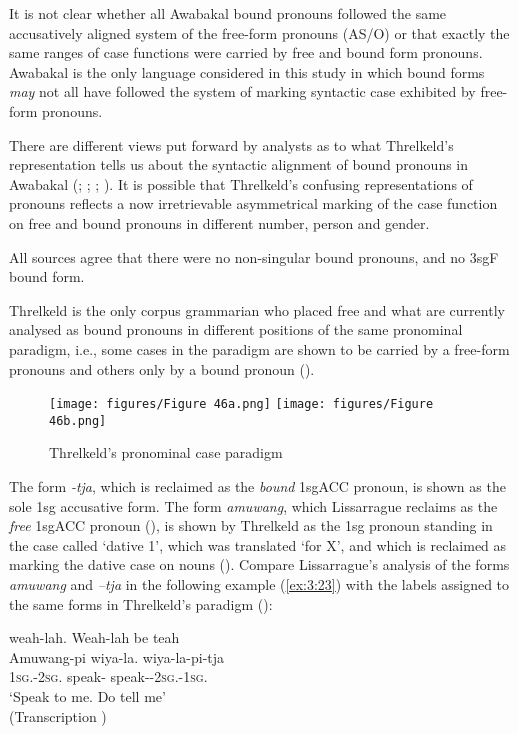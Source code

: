 It is not clear whether all Awabakal bound pronouns followed the same accusatively aligned system of the free-form pronouns (AS/O) or that exactly the same ranges of case functions were carried by free and bound form pronouns. Awabakal is the only language considered in this study in which bound forms \textit{may} not all have followed the system of marking syntactic case exhibited by free-form pronouns.

There are different views put forward by analysts as to what Threlkeld’s representation tells us about the syntactic alignment of bound pronouns in Awabakal (\citealt{capell_structure_1937}; \citealt{oppliger_phonology_1984}; \citealt{lissarrague_salvage_2006}; \citealt{dixon_australian_2002}). It is possible that Threlkeld’s confusing representations of pronouns reflects a now irretrievable asymmetrical marking of the case function on free and bound pronouns in different number, person and gender.

All sources agree that there were no non-singular bound pronouns, and no 3sgF bound form.

Threlkeld is the only corpus grammarian who placed free and what are currently analysed as bound pronouns in different positions of the same pronominal paradigm, i.e., some cases in the paradigm are shown to be carried by a free-form pronouns and others only by a bound pronoun ().
 
\begin{figure}
\texttt{[image: figures/Figure 46a.png]}
\texttt{[image: figures/Figure 46b.png]}
\caption{\label{fig:3:46} Threlkeld’s pronominal case paradigm \citeyearpar[19--20]{threlkeld_australian_1834} }
\end{figure}


The form \textit{-tja}, which is reclaimed as the \textit{bound} 1sgACC pronoun, is shown as the sole 1sg accusative form. The form \textit{amuwang}, which Lissarrague reclaims as the \textit{free} 1sgACC pronoun (\citeyear[46]{lissarrague_salvage_2006}), is shown by Threlkeld as the 1sg pronoun standing in the case called `dative 1', which was translated `for X', and which is reclaimed as marking the dative case on nouns (). Compare Lissarrague’s analysis of the forms \textit{amuwang}  and \textit{–tja} in the following example (\ref{ex:3:23}) with the labels assigned to the same forms in Threlkeld’s paradigm ():

\ea\label{ex:3:23}
	{weah-lah.}	{Weah-lah be teah} \\
Amuwang-pi 	wiya-la.          	wiya-la-pi-tja \\
1\textsc{sg}.-2\textsc{sg}. 	speak- 	speak--2\textsc{sg}.-1\textsc{sg}. \\
\glt `Speak to me. Do tell me' \\
(Transcription \citealt[46]{lissarrague_salvage_2006}) 
\z

